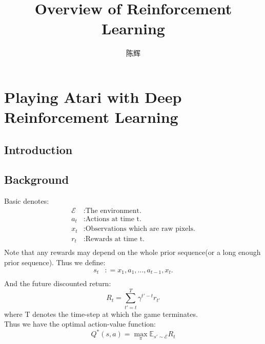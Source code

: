 \documentclass{article}
\title{Overview of Reinforcement Learning}
\author{陈辉}
\date{}
\numberwithin{equation}{subsection}
\newcommand{\citeinclude}[1]{}
\begin{document}
\maketitle
\tableofcontents
\newpage

\section{Playing Atari with Deep Reinforcement Learning}
\subsection{Introduction}
\subsection{Background}
Basic denotes:
\begin{align*}
    \mathcal{E} &: \text{The environment.}\\
    a_t &: \text{Actions at time t.}\\ 
    x_t &: \text{Observations which are raw pixels.}\\
    r_t &: \text{Rewards at time t.}\\
\end{align*}
Note that any rewards may depend on the whole prior sequence(or a long enough prior sequence). Thus we define:
\begin{align*}
        s_t &: = {x_1,a_1,\dots,a_{t-1},x_t}.\\
\end{align*}
And the future discounted return:
\begin{equation*}
        R_t = \sum_{t'=t}^T \gamma^{t'-t} r_{t'}
\end{equation*}
where T denotes the time-step at which the game terminates.\\
Thus we have the optimal action-value function:
\begin{equation*}
        Q^*(s,a)= \max_{\pi} \mathds{E}_{s'\sim\mathcal{E}}R_t
\end{equation*}






%

\end{document}
